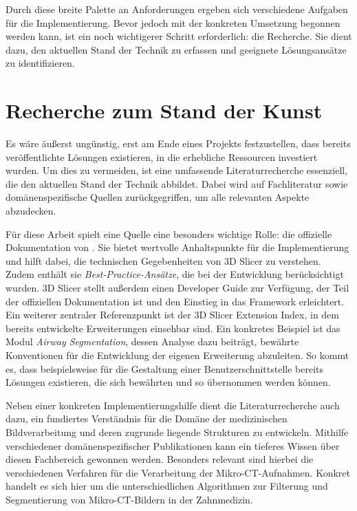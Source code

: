 Durch diese breite Palette an Anforderungen ergeben sich verschiedene Aufgaben
für die Implementierung. Bevor jedoch mit der konkreten Umsetzung begonnen werden
kann, ist ein noch wichtigerer Schritt erforderlich: die Recherche. Sie dient
dazu, den aktuellen Stand der Technik zu erfassen und geeignete Lösungsansätze zu
identifizieren.

\section{Recherche zum Stand der Kunst}
Es wäre äußerst ungünstig, erst am Ende eines Projekts festzustellen, dass bereits
veröffentlichte Lösungen existieren, in die erhebliche Ressourcen investiert
wurden. Um dies zu vermeiden, ist eine umfassende Literaturrecherche essenziell,
die den aktuellen Stand der Technik abbildet. Dabei wird auf Fachliteratur sowie
domänenspezifische Quellen zurückgegriffen, um alle relevanten Aspekte abzudecken.

Für diese Arbeit spielt eine Quelle eine besonders wichtige Rolle: die
offizielle Dokumentation von \citet{slicer2024}. Sie bietet wertvolle
Anhaltspunkte für die Implementierung und hilft dabei, die technischen Gegebenheiten
von 3D Slicer zu verstehen. Zudem enthält sie \textit{Best-Practice-Ansätze},
die bei der Entwicklung berücksichtigt wurden. 3D Slicer stellt außerdem einen Developer
Guide zur Verfügung, der Teil der offiziellen Dokumentation ist und den Einstieg
in das Framework erleichtert. Ein weiterer zentraler Referenzpunkt ist der 3D Slicer
Extension Index, in dem bereits entwickelte Erweiterungen einsehbar sind. Ein konkretes
Beispiel ist das Modul \textit{Airway Segmentation}, dessen Analyse dazu beiträgt,
bewährte Konventionen für die Entwicklung der eigenen Erweiterung abzuleiten. So
kommt es, dass beispielsweise für die Gestaltung einer Benutzerschnittstelle
bereits Lösungen existieren, die sich bewährten und so übernommen werden können.

Neben einer konkreten Implementierungshilfe dient die Literaturrecherche auch dazu,
ein fundiertes Verständnis für die Domäne der medizinischen Bildverarbeitung und
deren zugrunde liegende Strukturen zu entwickeln. Mithilfe verschiedener domänenspezifischer
Publikationen kann ein tieferes Wissen über diesen Fachbereich gewonnen werden.
Besonders relevant sind hierbei die verschiedenen Verfahren für die Verarbeitung
der Mikro-CT-Aufnahmen. Konkret handelt es sich hier um die unterschiedlichen Algorithmen
zur Filterung und Segmentierung von Mikro-CT-Bildern in der Zahnmedizin.

